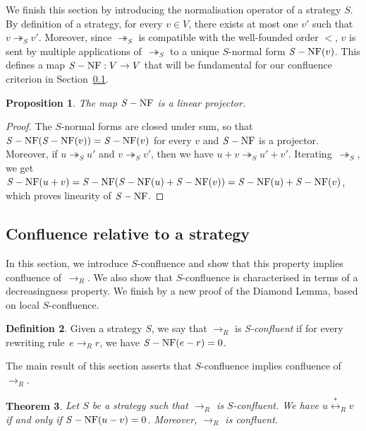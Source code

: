 \documentclass[10pt]{easychair}
\newtheorem{theorem}{Theorem}[section]
\newtheorem{proposition}[theorem]{Proposition}
\theoremstyle{definition}
\newtheorem{definition}[theorem]{Definition}
\newcommand\rewR{\to_R}
\newcommand\rewS{\twoheadrightarrow_S}
\newcommand\equivR{\overset{*}{\leftrightarrow}_R}
\DeclareMathOperator{\SNF}{{\it S}-NF}
\begin{document}
We finish this section by introducing the normalisation operator of a
strategy $S$. By definition of a strategy, for every $v\in V$, there
exists at most one $v'$ such that $v\rewS v'$. Moreover, since $\rewS$ is
compatible with the well-founded order $<$, $v$ is sent by multiple
applications of~$\rewS$ to a unique $S$-normal form $\SNF(v)$. This
defines a map $\SNF:V\to V$ that will be fundamental for our confluence
criterion in Section~\ref{sec:confluence_relative_to_a_strategy}.
\medskip

\begin{proposition}\label{prop:linearity_of_H}
  The map $\SNF$ is a linear projector.
\end{proposition}

\begin{proof}
  The $S$-normal forms are closed under sum, so that
  $\SNF(\SNF(v))=\SNF(v)$ for every $v$ and $\SNF$ is a projector.
  Moreover, if $u\rewS u'$ and $v\rewS v'$, then we have
  $u+v\rewS u'+v'$. Iterating~$\rewS$, we get
  $\SNF(u+v)=\SNF(\SNF(u)+\SNF(v))=\SNF(u)+\SNF(v)$, which proves
  linearity of $\SNF$.
\end{proof}

\subsection{Confluence relative to a strategy}
\label{sec:confluence_relative_to_a_strategy}

In this section, we introduce $S$-confluence and show that this property
implies confluence of~$\rewR$. We also show that $S$-confluence is
characterised in terms of a decreasingness property. We finish by a new
proof of the Diamond Lemma, based on local $S$-confluence.
\smallskip

\begin{definition}\label{def:standardisation_property}
  Given a strategy $S$, we say that $\rewR$ is \emph{S-confluent} if for
  every rewriting rule~$e\rewR r$, we have $\SNF(e-r)=0$.
\end{definition}
\smallskip

The main result of this section asserts that $S$-confluence implies
confluence of $\rewR$.
\medskip

\begin{theorem}\label{thm:S-confluence_criterion}
  Let $S$ be a strategy such that $\rewR$ is $S$-confluent. We have 
  $u\equivR v$ if and only if $\SNF(u-v)=0$. Moreover, $\rewR$ is
  confluent.
\end{theorem}
\end{document}

